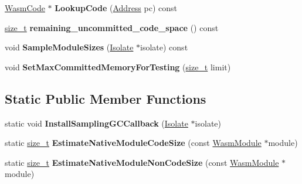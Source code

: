 \begin{DoxyCompactItemize}
\mbox{\hyperlink{classv8_1_1internal_1_1wasm_1_1WasmCode}{Wasm\+Code}} $\ast$ {\bfseries Lookup\+Code} (\mbox{\hyperlink{classuintptr__t}{Address}} pc) const
\item 
\mbox{\label{classv8_1_1internal_1_1wasm_1_1WasmCodeManager_a817bd8a7c74ad215be06d7387681d028}} 
\mbox{\hyperlink{classsize__t}{size\+\_\+t}} {\bfseries remaining\+\_\+uncommitted\+\_\+code\+\_\+space} () const
\item 
\mbox{\label{classv8_1_1internal_1_1wasm_1_1WasmCodeManager_a7401433454f3dec37dd14ab8b435c3cd}} 
void {\bfseries Sample\+Module\+Sizes} (\mbox{\hyperlink{classv8_1_1internal_1_1Isolate}{Isolate}} $\ast$isolate) const
\item 
\mbox{\label{classv8_1_1internal_1_1wasm_1_1WasmCodeManager_a63e429333e97d3b7df4eb6b413148c2f}} 
void {\bfseries Set\+Max\+Committed\+Memory\+For\+Testing} (\mbox{\hyperlink{classsize__t}{size\+\_\+t}} limit)
\end{DoxyCompactItemize}
\subsection*{Static Public Member Functions}
\begin{DoxyCompactItemize}
\item 
\mbox{\label{classv8_1_1internal_1_1wasm_1_1WasmCodeManager_a467f8764d4d5a71b6569eddfb2352e23}} 
static void {\bfseries Install\+Sampling\+G\+C\+Callback} (\mbox{\hyperlink{classv8_1_1internal_1_1Isolate}{Isolate}} $\ast$isolate)
\item 
\mbox{\label{classv8_1_1internal_1_1wasm_1_1WasmCodeManager_a830e39b25c460d141bb51369e782d2ec}} 
static \mbox{\hyperlink{classsize__t}{size\+\_\+t}} {\bfseries Estimate\+Native\+Module\+Code\+Size} (const \mbox{\hyperlink{structv8_1_1internal_1_1wasm_1_1WasmModule}{Wasm\+Module}} $\ast$module)
\item 
\mbox{\label{classv8_1_1internal_1_1wasm_1_1WasmCodeManager_a7c142bbb8bf99c83617f41f1655caa00}} 
static \mbox{\hyperlink{classsize__t}{size\+\_\+t}} {\bfseries Estimate\+Native\+Module\+Non\+Code\+Size} (const \mbox{\hyperlink{structv8_1_1internal_1_1wasm_1_1WasmModule}{Wasm\+Module}} $\ast$module)
\end{DoxyCompactItemize}
